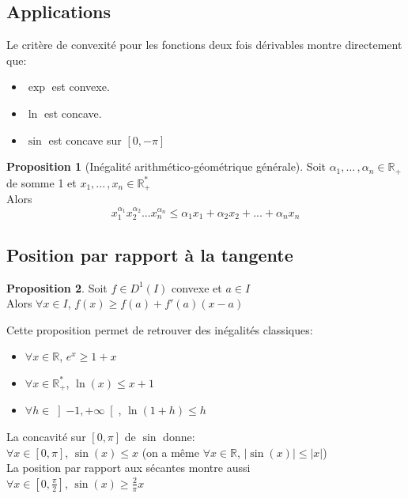 \documentclass[10pt,a4paper]{article}
\theoremstyle{definition}
\newtheorem{proposition}{Proposition}[section]
\begin{document}
\subsection{Applications}
Le critère de convexité pour les fonctions deux fois dérivables montre directement que:
\begin{itemize}
\item $\exp$ est convexe.
\item $\ln$ est concave.
\item $\sin$ est concave sur $[0, - \pi]$
\end{itemize}
\begin{proposition}[Inégalité arithmético-géométrique générale]
Soit $\alpha_1, ...\, , \alpha_n \in \mathbb{R}_+$ de somme 1 et $\left.x_1, ...\, , x_n \in \mathbb{R}_+^*\right.$ \\
Alors
\[x_1^{\alpha_1} x_2^{\alpha_2} ... x_n^{\alpha_n} \leq \alpha_1 x_1 + \alpha_2 x_2 + ... + \alpha_n x_n\]
\end{proposition}

\subsection{Position par rapport à la tangente}
\begin{proposition}
Soit $f \in D^1(I)$ convexe et $a \in I$ \\
Alors $\forall x \in I$, $f(x) \geq f(a) + f'(a)(x - a)$
\end{proposition}
\noindent Cette proposition permet de retrouver des inégalités classiques:
\begin{itemize}
\item $\forall x \in \mathbb{R}$, $e^x \geq 1 + x$
\item $\forall x \in \mathbb{R}_+^*$, $\ln(x) \leq x + 1$
\item $\forall h \in \left]-1, +\infty\right[$, $\ln(1 + h) \leq h$
\end{itemize}
La concavité sur $[0, \pi]$ de $\sin$ donne: \\
$\forall x \in [0, \pi]$, $\sin(x) \leq x$ (on a même $\forall x \in \mathbb{R}$, $|\sin(x)| \leq |x|$) \\
La position par rapport aux sécantes montre aussi \\
$\forall x \in \left[0, \frac{\pi}{2}\right]$, $\sin(x) \geq \frac{2}{\pi} x$
\end{document}

